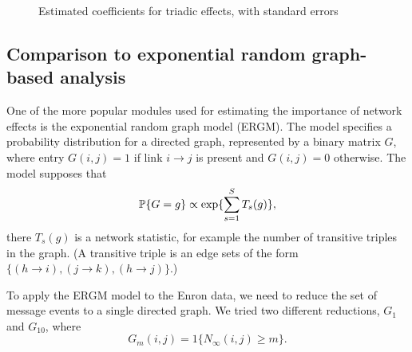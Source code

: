 \documentclass[final]{statsoc}
\begin{document}
\begin{figure}
  \centering
  \caption{Estimated coefficients for triadic effects, with standard errors}
  \label{F:enron-triad}
\end{figure}

\subsection{Comparison to exponential random graph-based analysis}

One of the more popular modules used for estimating the importance of network
effects is the exponential random graph model (ERGM).  The model specifies a
probability distribution for a directed graph, represented by a binary matrix
$G$, where entry $G(i,j) = 1$ if link $i \to j$ is present and $G(i,j) = 0$
otherwise.  The model supposes that
\[
  \mathbb{P}\{ G = g \}
    \propto
      \exp\{ \sum_{s=1}^S T_s(g) \},
\]
there $T_s(g)$ is a network statistic, for example the number of transitive
triples in the graph.  (A transitive triple is an edge sets of the form
$\{ (h \to i), (j \to k), (h \to j) \}$.)

To apply the ERGM model to the Enron data, we need to reduce the set of
message events to a single directed graph.  We tried two different reductions,
$G_1$ and $G_{10}$, where
\[
  G_m(i,j) = 1\{ N_\infty(i,j) \geq m \}.
\]
\end{document}
